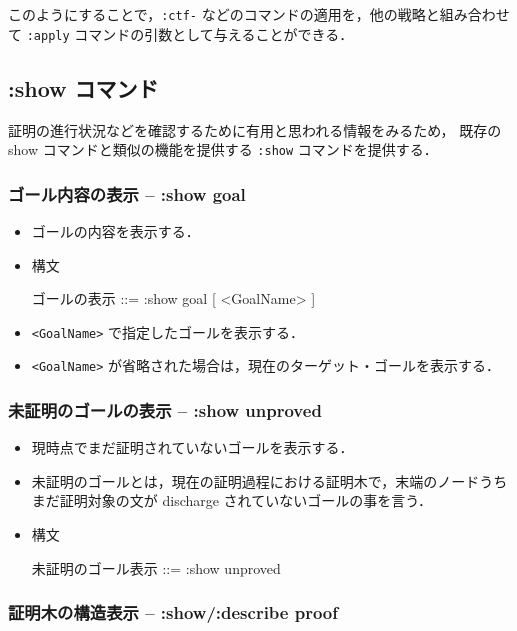 \documentclass[a4paper,oneside,10pt,here]{memoir}
\newenvironment{vvtm}%
{\parskip=0pt\lineskip=0pt\begin{center}\begin{minipage}{0.8\textwidth}\begin{snugshade}}%
  {\end{snugshade}\end{minipage}\end{center}}
\begin{document}
このようにすることで，\texttt{:ctf-} などのコマンドの適用を，他の戦略と組み合わせて
\texttt{:apply} コマンドの引数として与えることができる．

\subsection{:show コマンド}
証明の進行状況などを確認するために有用と思われる情報をみるため，
既存の show コマンドと類似の機能を提供する \texttt{:show} コマンドを提供する．

\subsubsection{ゴール内容の表示 -- :show goal}
\begin{itemize}
\item ゴールの内容を表示する．
\item 構文
  \begin{vvtm}
    \begin{simplev}
    ゴールの表示 ::= :show goal [ <GoalName> ]
  \end{simplev}
\end{vvtm}
\item \verb|<GoalName>| で指定したゴールを表示する．
\item \verb|<GoalName>| が省略された場合は，現在のターゲット・ゴールを表示する．
\end{itemize}

\subsubsection{未証明のゴールの表示 -- :show unproved}
\begin{itemize}
\item 現時点でまだ証明されていないゴールを表示する．
\item 未証明のゴールとは，現在の証明過程における証明木で，末端のノードうち
  まだ証明対象の文が discharge されていないゴールの事を言う．
\item 構文
  \begin{vvtm}
    \begin{simplev}
      未証明のゴール表示 ::= :show unproved
    \end{simplev}
  \end{vvtm}
\end{itemize}

\subsubsection{証明木の構造表示 -- :show/:describe  proof}
\end{document}

